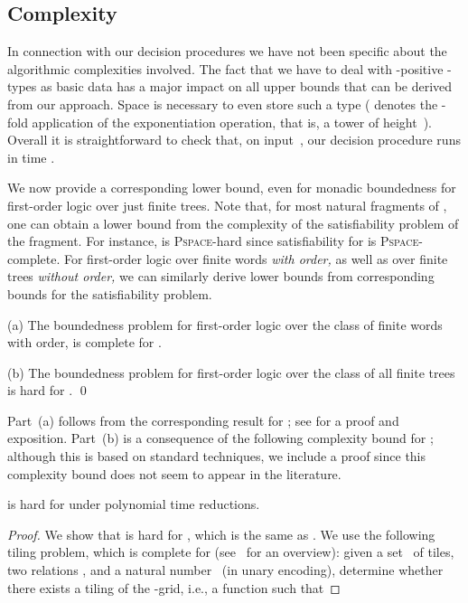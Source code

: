 \documentclass{LMCS}
\begin{document}
\begin{thm}
\medskip
\section{Complexity}
\label{sect:complexity}
\label{sect:start III}
\label{sect:end III}

In connection with our decision procedures we have not been
specific about the algorithmic complexities involved.
The fact that we have to deal with -positive -types
as basic data has a major impact on all upper bounds that
can be derived from our approach.
Space  is necessary to even
store such a type ( denotes
the -fold application of the exponentiation operation,
that is, a tower of height~).
Overall it is straightforward to check that, on input~,
our decision procedure runs
in time .

We now provide a corresponding lower bound,
even for monadic boundedness for first-order logic over just finite trees.
Note that, for most natural fragments of ,
one can obtain a lower bound from the complexity of the
satisfiability problem of the fragment.
For instance,  is \textsc{Pspace}-hard
since satisfiability for  is \textsc{Pspace}-complete.
For first-order logic over finite words \emph{with order,}
as well as over finite trees \emph{without order,}
we can similarly derive lower bounds from corresponding 
bounds for the satisfiability problem.

\begin{thm}\label{theo:lower complexity bound}
\textup{(a)}
The boundedness problem  for 
first-order logic over the class of finite words with order, 
is complete for .

\textup{(b)}
The boundedness problem 
 for first-order logic over the class
of all finite trees is hard for .
\qed\end{thm}

Part~(a) follows from the corresponding 
result for \?;
see \cite{Reinhardt02} for a proof and exposition.
Part~(b) is a consequence of the following complexity bound for
\?; although this is based on standard techniques,
we include a proof since this complexity bound does not seem to appear
in the literature.


\begin{prop}\label{Prop: SAT(FO,Tfin) hard}
 is hard for 
under polynomial time reductions.
\end{prop}
\begin{proof}
We show that  is hard for ,
which is the same as .
We use the following tiling problem, which is complete for
 (see~\cite{Harel85} for an overview)\?:
given a set~ of tiles, two relations , and
a natural number~ (in unary encoding), determine whether there exists a tiling
of the -grid, i.e., a function
 such that



\end{proof}
\end{thm}
\end{document}
